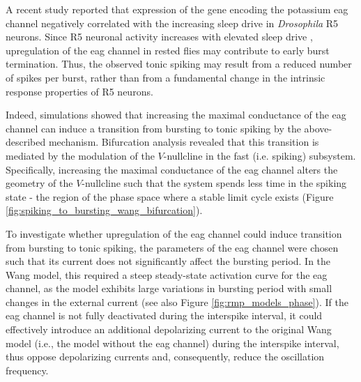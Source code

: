 \documentclass[../main.tex]{subfiles}
\begin{document}
A recent study reported that expression of the gene encoding the potassium \gls{eag} channel negatively correlated with the increasing sleep drive \parencite{doppSinglecellTranscriptomicsReveals2024} in \textit{Drosophila} R5 neurons. Since R5 neuronal activity increases with elevated sleep drive \parencite{liuSleepDriveEncoded2016}, upregulation of the \gls{eag} channel in rested flies may contribute to early burst termination. Thus, the observed tonic spiking may result from a reduced number of spikes per burst, rather than from a fundamental change in the intrinsic response properties of R5 neurons.

Indeed, simulations showed that increasing the maximal conductance of the \gls{eag} channel can induce a transition from bursting to tonic spiking by the above-described mechanism. Bifurcation analysis revealed that this transition is mediated by the modulation of the $V$-nullcline in the fast (i.e. spiking) subsystem. Specifically, increasing the maximal conductance of the \gls{eag} channel alters the geometry of the $V$-nullcline such that the system spends less time in the spiking state - the region of the phase space where a stable limit cycle exists (Figure \ref{fig:spiking_to_bursting_wang_bifurcation}).

To investigate whether upregulation of the \gls{eag} channel could induce transition from bursting to tonic spiking, the parameters of the \gls{eag} channel were chosen such that its current does not significantly affect the bursting period. In the Wang model, this required a steep steady-state activation curve for the \gls{eag} channel, as the model exhibits large variations in bursting period with small changes in the external current (see also Figure \ref{fig:rmp_models_phase}). If the \gls{eag} channel is not fully deactivated during the interspike interval, it could effectively introduce an additional depolarizing current to the original Wang model (i.e., the model without the \gls{eag} channel) during the interspike interval, thus oppose depolarizing currents and, consequently, reduce the oscillation frequency.

\end{document}
